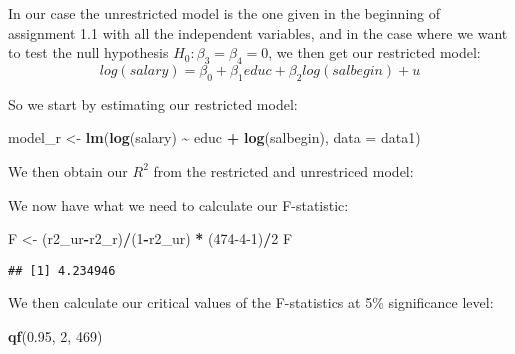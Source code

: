 \documentclass[
]{article}
\newenvironment{Shaded}{\begin{snugshade}}{\end{snugshade}}
\newcommand{\AttributeTok}[1]{\textcolor[rgb]{0.13,0.29,0.53}{#1}}
\newcommand{\DecValTok}[1]{\textcolor[rgb]{0.00,0.00,0.81}{#1}}
\newcommand{\FloatTok}[1]{\textcolor[rgb]{0.00,0.00,0.81}{#1}}
\newcommand{\FunctionTok}[1]{\textcolor[rgb]{0.13,0.29,0.53}{\textbf{#1}}}
\newcommand{\NormalTok}[1]{#1}
\newcommand{\OtherTok}[1]{\textcolor[rgb]{0.56,0.35,0.01}{#1}}
\newcommand{\SpecialCharTok}[1]{\textcolor[rgb]{0.81,0.36,0.00}{\textbf{#1}}}
\begin{document}
In our case the unrestricted model is the one given in the beginning of
assignment 1.1 with all the independent variables, and in the case where
we want to test the null hypothesis \(H_0: \beta_3 = \beta_4 = 0\), we
then get our restricted model:
\[log(salary)=\beta_0+\beta_1educ+\beta_2log(salbegin)+u\]

So we start by estimating our restricted model:

\begin{Shaded}
\begin{Highlighting}[]
\NormalTok{model\_r }\OtherTok{\textless{}{-}} \FunctionTok{lm}\NormalTok{(}\FunctionTok{log}\NormalTok{(salary) }\SpecialCharTok{\textasciitilde{}}\NormalTok{ educ }\SpecialCharTok{+} \FunctionTok{log}\NormalTok{(salbegin), }\AttributeTok{data =}\NormalTok{ data1)}
\end{Highlighting}
\end{Shaded}

We then obtain our \(R^2\) from the restricted and unrestriced model:

\begin{Shaded}
\end{Shaded}

We now have what we need to calculate our F-statistic:

\begin{Shaded}
\begin{Highlighting}[]
\NormalTok{F }\OtherTok{\textless{}{-}}\NormalTok{ (r2\_ur}\SpecialCharTok{{-}}\NormalTok{r2\_r)}\SpecialCharTok{/}\NormalTok{(}\DecValTok{1}\SpecialCharTok{{-}}\NormalTok{r2\_ur) }\SpecialCharTok{*}\NormalTok{ (}\DecValTok{474{-}4{-}1}\NormalTok{)}\SpecialCharTok{/}\DecValTok{2}
\NormalTok{F}
\end{Highlighting}
\end{Shaded}

\begin{verbatim}
## [1] 4.234946
\end{verbatim}

We then calculate our critical values of the F-statistics at 5\%
significance level:

\begin{Shaded}
\begin{Highlighting}[]
\FunctionTok{qf}\NormalTok{(}\FloatTok{0.95}\NormalTok{, }\DecValTok{2}\NormalTok{, }\DecValTok{469}\NormalTok{)}
\end{Highlighting}
\end{Shaded}
\end{document}
